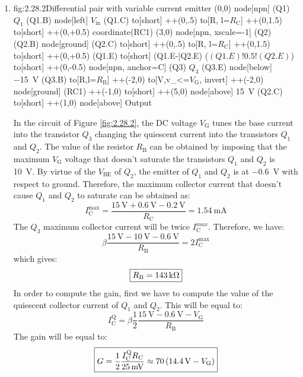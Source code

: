 \begin{enumerate}
    \item
    \begin{circuit}{fig:2.28.2}{Differential pair with variable current emitter}
        (0,0) node[npn] (Q1) {$Q_1$}
        (Q1.B) node[left] {$V_\text{in}$}
        (Q1.C) to[short] ++(0,.5)
        to[R, l=$R_\text{C}$] ++(0,1.5)
        to[short] ++(0,+0.5) coordinate(RC1)
        (3,0) node[npn, xscale=-1] (Q2) {}
        (Q2.B) node[ground] {}
        (Q2.C) to[short] ++(0,.5)
        to[R, l=$R_\text{C}$] ++(0,1.5)
        to[short] ++(0,+0.5)
        (Q1.E) to[short] (Q1.E-|Q2.E)
        ($(Q1.E)!0.5!(Q2.E)$) to[short] ++(0,-0.5)
        node[npn, anchor=C] (Q3) {$Q_3$}
        (Q3.E) node[below] {\SI{-15}{\volt}}
        (Q3.B) to[R,l=$R_\text{B}$] ++(-2,0)
        to[V,v_<=$V_\text{G}$, invert] ++(-2,0)
        node[ground] {}
        (RC1) ++(-1,0) to[short] ++(5,0)
        node[above] {\SI{+15}{\volt}}
        (Q2.C) to[short] ++(1,0)
        node[above] {Output}
    \end{circuit}
    In the circuit of Figure \ref{fig:2.28.2}, the DC voltage $V_\text{G}$ tunes the base current into the transistor $Q_3$ changing the quiescent current into the transistors $Q_1$ and $Q_2$.
    The value of the resistor $R_\text{B}$ can be obtained by imposing that the maximum $V_\text{G}$ voltage that doesn't saturate the transistors $Q_1$ and $Q_2$ is \SI{10}{\volt}. By virtue of the $V_\text{BE}$ of $Q_2$, the emitter of $Q_1$ and $Q_2$ is at \SI{-0.6}{\volt} with respect to ground. Therefore, the maximum collector current that doesn't cause $Q_1$ and $Q_2$ to saturate can be obtained as:
    \[I_\text{C}^\text{max}=\frac{\SI{15}{\volt}+\SI{0.6}{\volt}-\SI{0.2}{\volt}}{R_\text{C}}=\SI{1.54}{\milli\ampere}\]
    The $Q_3$ maximum collector current will be twice $I_\text{C}^{max}$. Therefore, we have:
    \[\beta\frac{\SI{15}{\volt}-\SI{10}{\volt}-\SI{0.6}{\volt}}{R_\text{B}}=2I_\text{C}^\text{max}\]
    which gives:
    \[\boxed{R_\text{B}=\SI{143}{\kilo\ohm}}\]
    In order to compute the gain, first we have to compute the value of the quiescent collector current of $Q_1$ and $Q_2$. This will be equal to:
    \[I_\text{C}^\text{Q}=\beta\frac{1}{2}\frac{\SI{15}{\volt}-\SI{0.6}{\volt}-V_\text{G}}{R_\text{B}}\]
    The gain will be equal to:
    \[\boxed{G=\frac{1}{2}\frac{I_\text{C}^\text{Q}R_\text{C}}{\SI{25}{\milli\volt}}\approx 70\left(\SI{14.4}{\volt}-V_\text{G}\right)}\]
\end{enumerate}


